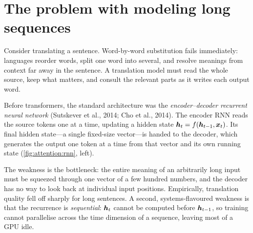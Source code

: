 \section{The problem with modeling long sequences}\label{sec:attention:long}

Consider translating a sentence. Word-by-word substitution fails immediately: languages reorder
words, split one word into several, and resolve meanings from context far away in the sentence.
A translation model must read the whole source, keep what matters, and consult the relevant parts
as it writes each output word.

Before transformers, the standard architecture was the \emph{encoder--decoder recurrent neural
network} (Sutskever et al., 2014; Cho et al., 2014). The encoder RNN reads the source tokens one at
a time, updating a hidden state $\bm{h}_t = f(\bm{h}_{t-1},\bm{x}_t)$. Its final hidden
state---a single fixed-size vector---is handed to the decoder, which generates the output one token
at a time from that vector and its own running state (\cref{fig:attention:rnn}, left).

The weakness is the bottleneck: the entire meaning of an arbitrarily long input must be squeezed
through one vector of a few hundred numbers, and the decoder has no way to look back at individual
input positions. Empirically, translation quality fell off sharply for long sentences. A second,
systems-flavoured weakness is that the recurrence is \emph{sequential}: $\bm{h}_t$ cannot be
computed before $\bm{h}_{t-1}$, so training cannot parallelise across the time dimension of a
sequence, leaving most of a GPU idle.

